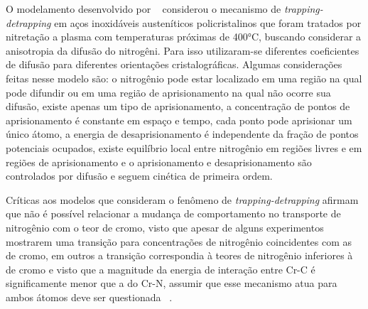 \documentclass[]{politex}
\begin{document}
	O modelamento desenvolvido por ~\cite{moskalioviene2011modeling} considerou o mecanismo de \textit{trapping-detrapping} em aços inoxidáveis austeníticos policristalinos que foram tratados por nitretação a plasma com temperaturas próximas de 400°C, buscando considerar a anisotropia da difusão do nitrogêni. Para isso utilizaram-se diferentes coeficientes de difusão para diferentes orientações cristalográficas. Algumas considerações feitas nesse modelo são: o nitrogênio pode estar localizado em uma região na qual pode difundir ou em uma região de aprisionamento na qual não ocorre sua difusão, existe apenas um tipo de aprisionamento, a concentração de pontos de aprisionamento é constante em espaço e tempo, cada ponto pode aprisionar um único átomo, a energia de desaprisionamento é independente da fração de pontos potenciais ocupados, existe equilíbrio local entre nitrogênio em regiões livres e em regiões de aprisionamento e o aprisionamento e desaprisionamento são controlados por difusão e seguem cinética de primeira ordem.\par
	Críticas aos modelos que consideram o fenômeno de \textit{trapping-detrapping} afirmam que não é possível relacionar a mudança de comportamento no transporte de nitrogênio com o teor de cromo, visto que apesar de alguns experimentos mostrarem uma transição para concentrações de nitrogênio coincidentes com as de cromo, em outros a transição correspondia à teores de nitrogênio inferiores à de cromo e visto que a magnitude da energia de interação entre Cr-C é significamente menor que a do Cr-N, assumir que esse mecanismo atua para ambos átomos deve ser questionada ~\cite{mandl2002concentration}.
	
\end{document}
